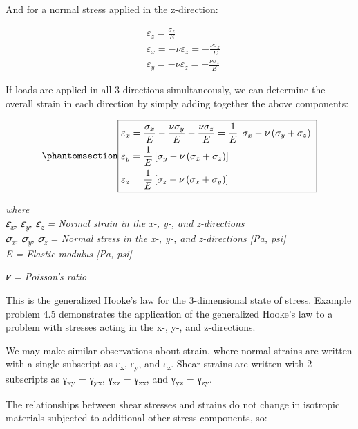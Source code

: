 \documentclass[
  letterpaper,
  DIV=11,
  numbers=noendperiod]{scrreprt}
\theoremstyle{definition}
\theoremstyle{remark}
\begin{document}
And for a normal stress applied in the z-direction:

\[
\begin{aligned}
& \varepsilon_z=\frac{\sigma_z}{E} \\
& \varepsilon_x=-\nu \varepsilon_z=-\frac{\nu \sigma_z}{E} \\
& \varepsilon_y=-\nu \varepsilon_z=-\frac{\nu \sigma_z}{E}
\end{aligned}
\]

If loads are applied in all 3 directions simultaneously, we can
determine the overall strain in each direction by simply adding together
the above components:

\begin{equation}\phantomsection\label{eq-4.7}{
\boxed{\begin{aligned}
& \varepsilon_x=\frac{\sigma_x}{E}-\frac{\nu \sigma_y}{E}-\frac{\nu \sigma_z}{E}=\frac{1}{E}\left[\sigma_x-\nu\left(\sigma_y+\sigma_z\right)\right] \\
& \varepsilon_y=\frac{1}{E}\left[\sigma_y-\nu\left(\sigma_x+\sigma_z\right)\right] \\
& \varepsilon_z=\frac{1}{E}\left[\sigma_z-\nu\left(\sigma_x+\sigma_y\right)\right]
\end{aligned}}
}\end{equation}

\emph{where}\\
\emph{𝜀\textsubscript{x}, 𝜀\textsubscript{y}, 𝜀\textsubscript{z} =
Normal strain in the x-, y-, and z-directions}\\
\emph{𝜎\textsubscript{x}, 𝜎\textsubscript{y}, 𝜎\textsubscript{z} =
Normal stress in the x-, y-, and z-directions {[}Pa, psi{]}}\\
\emph{E = Elastic modulus {[}Pa, psi{]}}

\emph{𝜈 = Poisson's ratio}

This is the generalized Hooke's law for the 3-dimensional state of
stress. Example problem 4.5 demonstrates the application of the
generalized Hooke's law to a problem with stresses acting in the x-, y-,
and z-directions.

We may make similar observations about strain, where normal strains are
written with a single subscript as ε\textsubscript{x},
ε\textsubscript{y}, and ε\textsubscript{z}. Shear strains are written
with 2 subscripts as γ\textsubscript{xy} = γ\textsubscript{yx},
γ\textsubscript{xz} = γ\textsubscript{zx}, and γ\textsubscript{yz} =
γ\textsubscript{zy}.

The relationships between shear stresses and strains do not change in
isotropic materials subjected to additional other stress components, so:
\end{document}
